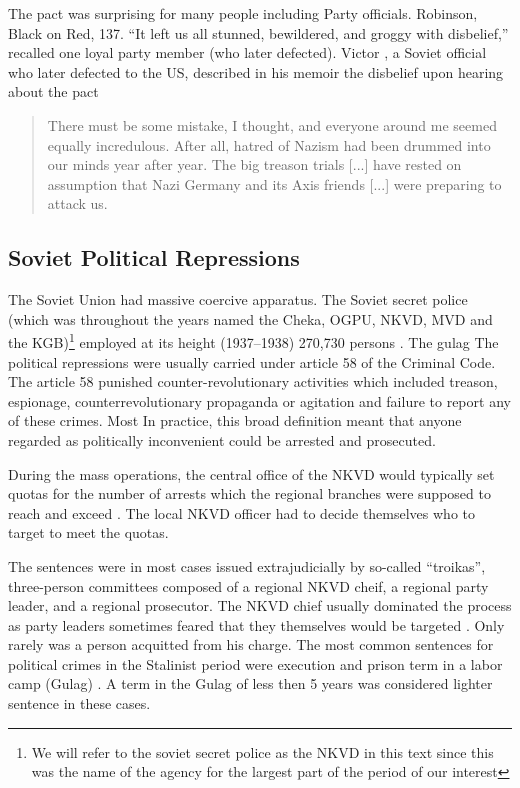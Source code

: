 The pact was surprising for many people including Party officials. 
Robinson, Black on Red, 137. “It left us all stunned, bewildered, and groggy with disbelief,” recalled one loyal party member (who later defected). 
Victor  \citet[p. 332]{kravchenko_i_1947}, a Soviet official who later defected to the US,   described in  his memoir the disbelief upon hearing about the pact  

\begin{quote}
There must be some mistake, I thought, and everyone around me seemed equally incredulous. After all, hatred of Nazism had been drummed into our minds year after year.  The big treason trials [...] have rested on assumption that Nazi Germany and its Axis friends [...]  were preparing to attack us. 
\end{quote}


\subsection{Soviet Political Repressions}
The Soviet Union had massive coercive apparatus. The Soviet secret police (which was throughout the years named the Cheka, OGPU, NKVD, MVD and  the KGB)\footnote{We will refer to the soviet secret police as the NKVD in this text since this was the name of the agency for the largest part of the period of our interest} employed at its height (1937–1938)  270,730 persons \citep[p. 2]{gregory_terror_2009}. The gulag  
The political repressions were usually carried under article 58 of the Criminal Code. The article 58 punished counter-revolutionary activities 
which included treason, espionage, counterrevolutionary propaganda or agitation and  failure to report any of these crimes. Most 
In practice, this broad definition meant that anyone regarded as politically inconvenient could be arrested and prosecuted. 

During the mass operations, the central office of the NKVD would typically set quotas for the number of arrests which the regional branches were supposed to reach and exceed \citep[chapter 6]{gregory_terror_2009}. The local NKVD officer had to decide themselves who to target to meet the quotas. 

The sentences were in most cases issued extrajudicially by so-called \enquote{troikas}, three-person committees composed of a regional NKVD cheif, a regional party leader, and a regional prosecutor. The NKVD chief usually dominated the process as party leaders sometimes feared that they themselves would be targeted \citep[p. 82]{snyder_bloodlands:_2011}. Only rarely was a person acquitted from his charge. 
The most common sentences for political crimes in the Stalinist period were  execution and prison term in a labor camp (Gulag) \citep[p. 21]{gregory_terror_2009}. 
A term in the Gulag of less then 5 years was considered lighter sentence in these cases.

